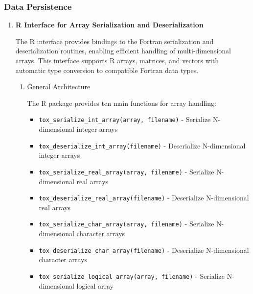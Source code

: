 \documentclass[11pt]{article}
\begin{document}
\subsubsection{Data Persistence}
\begin{enumerate}
	\item \textbf{R Interface for Array Serialization and Deserialization}
	      
	      The R interface provides bindings to the Fortran serialization and deserialization
	      routines, enabling efficient handling of multi-dimensional arrays. This interface
	      supports R arrays, matrices, and vectors with automatic type conversion to
	      compatible Fortran data types.
	      \begin{enumerate}
	      	\item {General Architecture}
	      	      
	      	      The R package provides ten main functions for array handling:
	      	      
	      	      \begin{itemize}
	      	      	\item \texttt{tox\_serialize\_int\_array(array, filename)} -
	      	      	      Serialize N-dimensional integer arrays
	      	      	      
	      	      	\item \texttt{tox\_deserialize\_int\_array(filename)} - Deserialize
	      	      	      N-dimensional integer arrays
	      	      	      
	      	      	\item \texttt{tox\_serialize\_real\_array(array, filename)} -
	      	      	      Serialize N-dimensional real arrays
	      	      	      
	      	      	\item \texttt{tox\_deserialize\_real\_array(filename)} - Deserialize
	      	      	      N-dimensional real arrays
	      	      	      
	      	      	\item \texttt{tox\_serialize\_char\_array(array, filename)} -
	      	      	      Serialize N-dimensional character arrays
	      	      	      
	      	      	\item \texttt{tox\_deserialize\_char\_array(filename)} - Deserialize
	      	      	      N-dimensional character arrays
	      	      	      
	      	      	\item \texttt{tox\_serialize\_logical\_array(array, filename)} -
	      	      	      Serialize N-dimensional logical array
	      	      	      

\end{itemize}
\end{enumerate}
\end{enumerate}
\end{document}
